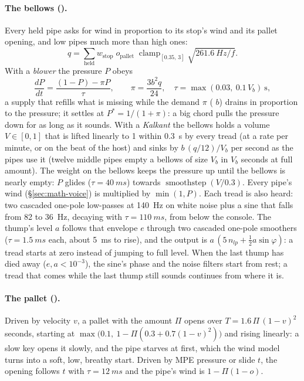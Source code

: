 \paragraph{The bellows ().} Every held pipe asks for wind in proportion to its stop's wind and its pallet
opening, and low pipes much more than high ones:
\begin{equation}
  q = \sum_{\text{held}} w_\mathrm{stop}\;o_\mathrm{pallet}\;\operatorname{clamp}_{[0.35,\,3]}\sqrt{\SI{261.6}{Hz}/f}.
\end{equation}
With a \emph{blower} the pressure $P$ obeys
\begin{equation}
  \frac{dP}{dt} = \frac{(1-P) - \pi P}{\tau},\qquad \pi = \frac{3b^2q}{24},\quad \tau = \max(0.03,\ 0.1\,V_b)\ \mathrm{s},
\end{equation}
a supply that refills what is missing while the demand $\pi$ ( $b$) drains in proportion to the pressure; it
settles at $P^* = 1/(1+\pi)$: a big chord pulls the pressure down for as long as it sounds. With a \emph{Kalkant} the
bellows holds a volume $V\in[0,1]$ that is lifted linearly to 1 within \SI{0.3}{s} by every tread (at a rate per minute,
or on the beat of the host) and sinks by $b\,(q/12)/V_b$ per second as the pipes use it (twelve middle pipes empty a
bellows of size $V_b$ in $V_b$ seconds at full amount). The weight on the bellows keeps the pressure up until the
bellows is nearly empty: $P$ glides ($\tau = \SI{40}{ms}$) towards $\operatorname{smoothstep}(V/0.3)$. Every pipe's wind
(\S\ref{sec:math-voice}) is multiplied by $\min(1,P)$. Each tread is also heard: two cascaded one-pole low-passes at
\SI{140}{Hz} on white noise plus a sine that falls from 82 to \SI{36}{Hz}, decaying with $\tau = \SI{110}{ms}$, from below
the console. The thump's level $a$ follows that envelope $e$ through two cascaded one-pole smoothers
($\tau = \SI{1.5}{ms}$ each, about \SI{5}{ms} to rise), and the output is $a\,(5\,n_{lp} + \tfrac12 a\sin\varphi)$: a
tread starts at zero instead of jumping to full level. When the last thump has died away ($e, a < 10^{-3}$), the sine's
phase and the noise filters start from rest; a tread that comes while the last thump still sounds continues from
where it is.

\paragraph{The pallet ().} Driven by velocity $v$, a pallet with the amount $\Pi$ opens over
$T = 1.6\,\Pi\,(1-v)^2$ seconds, starting at $\max\bigl(0.1,\ 1-\Pi(0.3+0.7(1-v)^2)\bigr)$ and rising linearly: a slow
key opens it slowly, and the pipe starves at first, which the wind model turns into a soft, low, breathy start. Driven
by MPE pressure or slide $t$, the opening follows $t$ with $\tau=\SI{12}{ms}$ and the pipe's wind is $1-\Pi(1-o)$.


